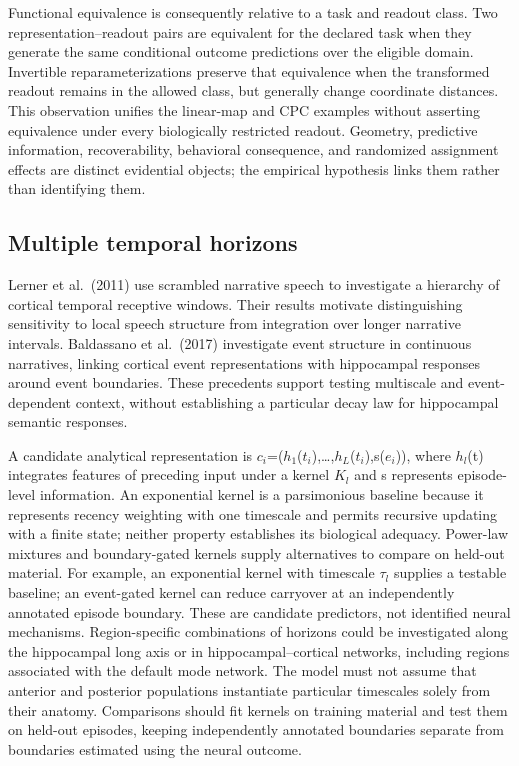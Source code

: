 \documentclass[11pt]{article}
\begin{document}
Functional equivalence is consequently relative to a task and readout
class. Two representation--readout pairs are equivalent for the declared
task when they generate the same conditional outcome predictions over
the eligible domain. Invertible reparameterizations preserve that
equivalence when the transformed readout remains in the allowed class,
but generally change coordinate distances. This observation unifies the
linear-map and CPC examples without asserting equivalence under every
biologically restricted readout. Geometry, predictive information,
recoverability, behavioral consequence, and randomized assignment
effects are distinct evidential objects; the empirical hypothesis links
them rather than identifying them.

\hypertarget{multiple-temporal-horizons}{%
\subsection{Multiple temporal
horizons}\label{multiple-temporal-horizons}}

Lerner et al.~(2011) use scrambled narrative speech to investigate a
hierarchy of cortical temporal receptive windows. Their results motivate
distinguishing sensitivity to local speech structure from integration
over longer narrative intervals. Baldassano et al.~(2017) investigate
event structure in continuous narratives, linking cortical event
representations with hippocampal responses around event boundaries.
These precedents support testing multiscale and event-dependent context,
without establishing a particular decay law for hippocampal semantic
responses.

A candidate analytical representation is
\(c_i\)=(\(h_1\)(\(t_i\)),\ldots,\(h_L\)(\(t_i\)),s(\(e_i\))), where
\(h_l\)(t) integrates features of preceding input under a kernel \(K_l\)
and s represents episode-level information. An exponential kernel is a
parsimonious baseline because it represents recency weighting with one
timescale and permits recursive updating with a finite state; neither
property establishes its biological adequacy. Power-law mixtures and
boundary-gated kernels supply alternatives to compare on held-out
material. For example, an exponential kernel with timescale \(\tau_l\)
supplies a testable baseline; an event-gated kernel can reduce carryover
at an independently annotated episode boundary. These are candidate
predictors, not identified neural mechanisms. Region-specific
combinations of horizons could be investigated along the hippocampal
long axis or in hippocampal--cortical networks, including regions
associated with the default mode network. The model must not assume that
anterior and posterior populations instantiate particular timescales
solely from their anatomy. Comparisons should fit kernels on training
material and test them on held-out episodes, keeping independently
annotated boundaries separate from boundaries estimated using the neural
outcome.
\end{document}
